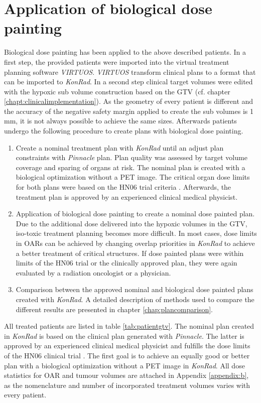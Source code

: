 \section{Application of biological dose painting}
Biological dose painting has been applied to the above described patients. In a first step, the provided patients were imported into the virtual treatment planning software \textit{VIRTUOS}. \textit{VIRTUOS} transform clinical plans to a format that can be imported to \textit{KonRad}. In a second step clinical target volumes were edited with the hypoxic sub volume construction based on the GTV (cf. chapter \ref{chapt:clinicalimplementation}). As the geometry of every patient is different and the accuracy of the negative safety margin applied to create the sub volumes is 1 mm, it is not always possible to achieve the same sizes. Afterwards patients undergo the following procedure to create plans with biological dose painting.
\begin{enumerate}
\item Create a nominal treatment plan with \textit{KonRad} until an adjust plan constraints with \textit{Pinnacle} plan. Plan quality was assessed by target volume coverage and sparing of organs at risk. The nominal plan is created with a biological optimization without a PET image. The critical organ dose limits for both plans were based on the HN06 trial criteria \cite{HN06}. Afterwards, the treatment plan is approved by an experienced clinical medical physicist.
\item Application of biological dose painting to create a nominal dose painted plan. Due to the additional dose delivered into the hypoxic volumes in the GTV, iso-toxic treatment planning becomes more difficult. In most cases, dose limits in OARs can be achieved by changing overlap priorities in \textit{KonRad} to achieve a better treatment of critical structures. If dose painted plans were within limits of the HN06 trial or the clinically approved plan, they were again evaluated by a radiation oncologist or a physician.
\item Comparison between the approved nominal and biological dose painted plans created with \textit{KonRad}. A detailed description of methods used to compare the different results are presented in chapter \ref{chap:plancomparison}.
\end{enumerate}
All treated patients are listed in table \ref{tab:patientgtv}. The nominal plan created in \textit{KonRad} is based on the clinical plan generated with \textit{Pinnacle}. The latter is approved by an experienced clinical medical physicist and fulfills the dose limits of the HN06 clinical trial \cite{HN06}. The first goal is to achieve an equally good or better plan with a biological optimization without a PET image in \textit{KonRad}. All dose statistics for OAR and tumour volumes are attached in Appendix \ref{appendix:b}, as the nomenclature and number of incorporated treatment  volumes varies with every patient.
